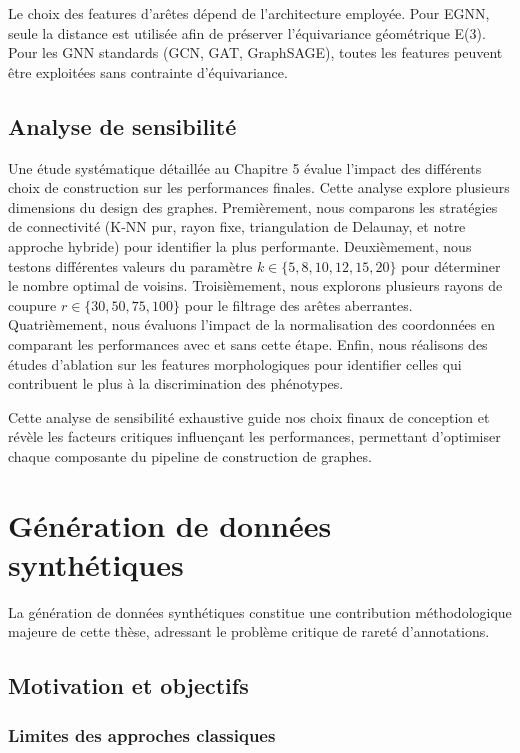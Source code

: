 Le choix des features d'arêtes dépend de l'architecture employée. Pour EGNN, seule la distance est utilisée afin de préserver l'équivariance géométrique E(3). Pour les GNN standards (GCN, GAT, GraphSAGE), toutes les features peuvent être exploitées sans contrainte d'équivariance.

\subsection{Analyse de sensibilité}

Une étude systématique détaillée au Chapitre 5 évalue l'impact des différents choix de construction sur les performances finales. Cette analyse explore plusieurs dimensions du design des graphes. Premièrement, nous comparons les stratégies de connectivité (K-NN pur, rayon fixe, triangulation de Delaunay, et notre approche hybride) pour identifier la plus performante. Deuxièmement, nous testons différentes valeurs du paramètre $k \in \{5, 8, 10, 12, 15, 20\}$ pour déterminer le nombre optimal de voisins. Troisièmement, nous explorons plusieurs rayons de coupure $r \in \{30, 50, 75, 100\}$ pour le filtrage des arêtes aberrantes. Quatrièmement, nous évaluons l'impact de la normalisation des coordonnées en comparant les performances avec et sans cette étape. Enfin, nous réalisons des études d'ablation sur les features morphologiques pour identifier celles qui contribuent le plus à la discrimination des phénotypes.

Cette analyse de sensibilité exhaustive guide nos choix finaux de conception et révèle les facteurs critiques influençant les performances, permettant d'optimiser chaque composante du pipeline de construction de graphes.

\section{Génération de données synthétiques}

La génération de données synthétiques constitue une contribution méthodologique majeure de cette thèse, adressant le problème critique de rareté d'annotations.

\subsection{Motivation et objectifs}

\subsubsection{Limites des approches classiques}

